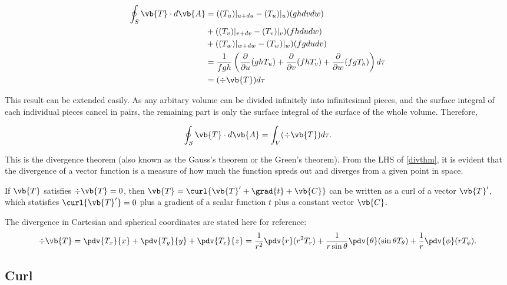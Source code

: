 \documentclass[english,a4paper,12pt]{report}
\begin{document}
\begin{equation} \label{divpre} 
	\begin{aligned} 
    \oint_{S} \vb{T} \cdot d\vb{A} &= ((T_u)|_{u+du} - (T_u)|_{u})(ghdvdw) \\ &+ ((T_v)|_{v+dv} - (T_v)|_{v})(fhdudw) \\ &+ ((T_w)|_{w+dw} - (T_w)|_{w})(fgdudv) \\
    &= \frac{1}{fgh} \left( 
		\frac{\partial}{\partial u} (ghT_{u} ) + 
		\frac{\partial}{\partial v} (fhT_{v} )+ 
		\frac{\partial}{\partial w} (fgT_{h} ) \right) d\tau \\
	&= (\div{\vb{T}}) d\tau
    \end{aligned} 
\end{equation} 
	
This result can be extended easily. As any arbitary volume can be divided infinitely into infinitesimal pieces, and the surface integral of each individual pieces cancel in pairs, the remaining part is only the surface integral of the surface of the whole volume. Therefore,
	
\begin{equation} 
	\oint_{S} \vb{T} \cdot d\vb{A} = \int_{V}(\div{\vb{T} }) d\tau \label{divthm}. 
\end{equation}
	
This is the divergence theorem (also known as the Gauss's theorem or the Green's theorem). From the LHS of \cref{divthm}, it is evident that the divergence of a vector function is a measure of how much the function spreds out and diverges from a given point in space.

If \(\vb{T} \) satisfies \(\div{\vb{T} } = 0 \), then \(\vb{T} = \curl{\vb{T} ' + \grad{t} + \vb{C} } \) can be written as a curl of a vector \(\vb{T} '\), which statisfies \(\curl{\vb{T} '} = 0 \) plus a gradient of a scalar function \(t\) plus a constant vector \(\vb{C} \).        

The divergence in Cartesian and spherical coordinates are stated here for reference:
\begin{equation} 
	\div{\vb{T}} = \pdv{T_x}{x} + \pdv{T_y}{y} + \pdv{T_z}{z} = \frac{1}{r^2}\pdv{r}(r^2T_r) + \frac{1}{r\sin{\theta}}\pdv{\theta}(\sin{\theta}T_{\theta}) + \frac{1}{r}\pdv{\phi}(rT_{\phi}). 
\end{equation}
	
\subsection{Curl}
\end{document}
